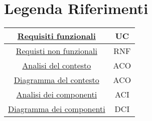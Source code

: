 \section{Legenda Riferimenti}
\label{secD1:LegendaRiferimenti}

\begin{tabular}{|c|c|}
    \hline
    \hyperref[secD2:RequisitiFunzionali]{Requisiti funzionali} & UC\\
    \hline
    \hyperref[secD2:RequisitiNonFunzionali]{Requisti non funzionali} & RNF\\
    \hline
    \hyperref[secD2:AnalisiDelContesto]{Analisi del contesto} & ACO\\
    \hline
    \hyperref[secD2:DiagrammaContesto]{Diagramma del contesto} & ACO\\
    \hline
    \hyperref[secD2:AnalisiDeiComponenti]{Analisi dei componenti} & ACI\\
    \hline
    \hyperref[secD2:DiagrammaComponenti]{Diagramma dei componenti} & DCI\\
    \hline
\end{tabular}